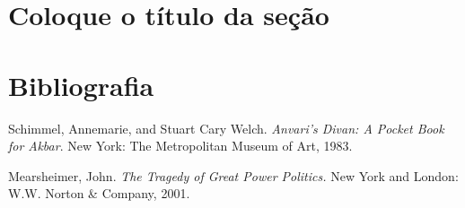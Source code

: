 \documentclass[a4paper,twoside]{article} %
\begin{document}
\lipsum[1-5] %



\section{Coloque o título da seção}
\lipsum[1-5]

\section*{Bibliografia}

\setlength{\parindent}{0pt}

Schimmel, Annemarie, and Stuart Cary Welch. \textit{Anvari's Divan: A Pocket Book for Akbar}.  New York: The Metropolitan Museum of Art, 1983.

\setlength{\parskip}{10pt} %

Mearsheimer, John. \textit{The Tragedy of Great Power Politics.} New York and London: W.W. Norton \& Company, 2001.
\end{document}
